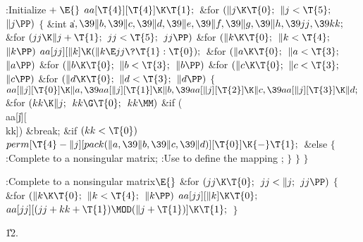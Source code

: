 \Y\B\4:Initialize\X${}\mathrel+\E{}$\6
$\\{aa}[\T{4}][\T{4}]\K\T{1};{}$\6
\&{for} ${}(\|j\K\T{0};{}$ ${}\|j<\T{5};{}$ ${}\|j\PP){}$\5
${}\{{}$\1\6
\&{int} \|a${},\39\|b,\39\|c,\39\|d,\39\|e,\39\|f,\39\|g,\39\|h,\39\\{jj},\39%
\\{kk};{}$\7
\&{for} ${}(\\{jj}\K\|j+\T{1};{}$ ${}\\{jj}<\T{5};{}$ ${}\\{jj}\PP){}$\1\6
\&{for} ${}(\|k\K\T{0};{}$ ${}\|k<\T{4};{}$ ${}\|k\PP){}$\1\5
${}\\{aa}[\\{jj}][\|k]\K(\|k\E\\{jj}\?\T{1}:\T{0});{}$\2\2\6
\&{for} ${}(\|a\K\T{0};{}$ ${}\|a<\T{3};{}$ ${}\|a\PP){}$\1\6
\&{for} ${}(\|b\K\T{0};{}$ ${}\|b<\T{3};{}$ ${}\|b\PP){}$\1\6
\&{for} ${}(\|c\K\T{0};{}$ ${}\|c<\T{3};{}$ ${}\|c\PP){}$\1\6
\&{for} ${}(\|d\K\T{0};{}$ ${}\|d<\T{3};{}$ ${}\|d\PP){}$\5
${}\{{}$\1\6
${}\\{aa}[\|j][\T{0}]\K\|a,\39\\{aa}[\|j][\T{1}]\K\|b,\39\\{aa}[\|j][\T{2}]\K%
\|c,\39\\{aa}[\|j][\T{3}]\K\|d;{}$\6
\&{for} ${}(\\{kk}\K\|j;{}$ ${}\\{kk}\G\T{0};{}$ ${}\\{kk}\MM){}$\1\6
\&{if} (\\{aa}[\|j][\\{kk}])\1\5
\&{break};\2\2\6
\&{if} ${}(\\{kk}<\T{0}){}$\1\5
${}\\{perm}[\T{4}-\|j][\\{pack}(\|a,\39\|b,\39\|c,\39\|d)][\T{0}]\K{-}\T{1};{}$%
\2\6
\&{else}\5
${}\{{}$\1\6
:Complete  to a nonsingular matrix\X;\6
:Use  to define the mapping \X;\6
\4${}\}{}$\2\6
\4${}\}{}$\2\2\2\2\6
\4${}\}{}$\2\par
\fi

\B{}:Complete  to a nonsingular matrix\X${}\E{}$\6
\&{for} ${}(\\{jj}\K\T{0};{}$ ${}\\{jj}<\|j;{}$ ${}\\{jj}\PP){}$\5
${}\{{}$\1\6
\&{for} ${}(\|k\K\T{0};{}$ ${}\|k<\T{4};{}$ ${}\|k\PP){}$\1\5
${}\\{aa}[\\{jj}][\|k]\K\T{0};{}$\2\6
${}\\{aa}[\\{jj}][(\\{jj}+\\{kk}+\T{1})\MOD(\|j+\T{1})]\K\T{1};{}$\6
\4${}\}{}$\2\par
\U12.\fi

